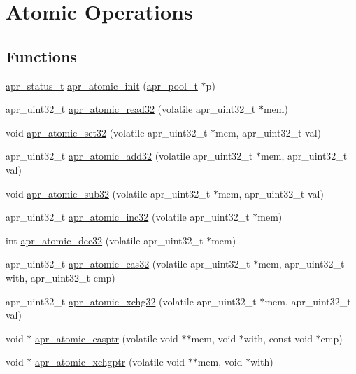 \hypertarget{group__apr__atomic}{\section{Atomic Operations}
\label{group__apr__atomic}
}
\subsection*{Functions}
\begin{DoxyCompactItemize}
\item 
\hyperlink{group__apr__errno_gaf76ee4543247e9fb3f3546203e590a6c}{apr\-\_\-status\-\_\-t} \hyperlink{group__apr__atomic_gaa89b4022de39ca4d1c2ae6715e888e97}{apr\-\_\-atomic\-\_\-init} (\hyperlink{group__apr__pools_gaf137f28edcf9a086cd6bc36c20d7cdfb}{apr\-\_\-pool\-\_\-t} $\ast$p)
\item 
apr\-\_\-uint32\-\_\-t \hyperlink{group__apr__atomic_gafba4de90e113d26536cff48418689771}{apr\-\_\-atomic\-\_\-read32} (volatile apr\-\_\-uint32\-\_\-t $\ast$mem)
\item 
void \hyperlink{group__apr__atomic_gac689de9df18c093f66959227359328bb}{apr\-\_\-atomic\-\_\-set32} (volatile apr\-\_\-uint32\-\_\-t $\ast$mem, apr\-\_\-uint32\-\_\-t val)
\item 
apr\-\_\-uint32\-\_\-t \hyperlink{group__apr__atomic_ga3ef16e13b679710fafd5196713e17433}{apr\-\_\-atomic\-\_\-add32} (volatile apr\-\_\-uint32\-\_\-t $\ast$mem, apr\-\_\-uint32\-\_\-t val)
\item 
void \hyperlink{group__apr__atomic_ga4603396650e844bd987f01358ccb4df1}{apr\-\_\-atomic\-\_\-sub32} (volatile apr\-\_\-uint32\-\_\-t $\ast$mem, apr\-\_\-uint32\-\_\-t val)
\item 
apr\-\_\-uint32\-\_\-t \hyperlink{group__apr__atomic_ga4af33da5aa6493ec321af14bedfc47a9}{apr\-\_\-atomic\-\_\-inc32} (volatile apr\-\_\-uint32\-\_\-t $\ast$mem)
\item 
int \hyperlink{group__apr__atomic_ga7a8d16335fdcd27f2baca90df35ad300}{apr\-\_\-atomic\-\_\-dec32} (volatile apr\-\_\-uint32\-\_\-t $\ast$mem)
\item 
apr\-\_\-uint32\-\_\-t \hyperlink{group__apr__atomic_gae45c529f14f8489102382bd3fd4cce22}{apr\-\_\-atomic\-\_\-cas32} (volatile apr\-\_\-uint32\-\_\-t $\ast$mem, apr\-\_\-uint32\-\_\-t with, apr\-\_\-uint32\-\_\-t cmp)
\item 
apr\-\_\-uint32\-\_\-t \hyperlink{group__apr__atomic_ga50850e462d65e0409d5a93a6b4ec26c6}{apr\-\_\-atomic\-\_\-xchg32} (volatile apr\-\_\-uint32\-\_\-t $\ast$mem, apr\-\_\-uint32\-\_\-t val)
\item 
void $\ast$ \hyperlink{group__apr__atomic_gafdd02b41cc39ade873daa2734597b0fa}{apr\-\_\-atomic\-\_\-casptr} (volatile void $\ast$$\ast$mem, void $\ast$with, const void $\ast$cmp)
\item 
void $\ast$ \hyperlink{group__apr__atomic_gaab4c1c5b8be70ded06dd31a1a4f65bf6}{apr\-\_\-atomic\-\_\-xchgptr} (volatile void $\ast$$\ast$mem, void $\ast$with)
\end{DoxyCompactItemize}


